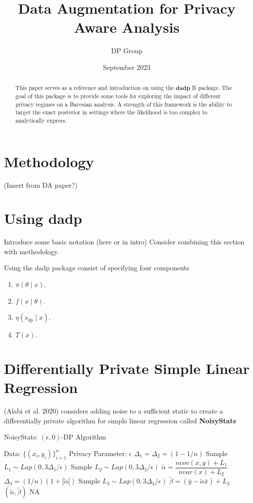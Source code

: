 \documentclass{article}\usepackage[]{graphicx}\usepackage[]{xcolor}
\title{Data Augmentation for Privacy Aware Analysis}
\author{DP Group}
\date{September 2023}
\theoremstyle{definition}
\newcommand{\dpn}{\textbf{dadp}}
\begin{document}
\maketitle

\begin{abstract}
    This paper serves as a reference and introduction on using the $\dpn$ R
    package. The goal of this package is to provide some tools for exploring the
    impact of different privacy regimes on a Bayesian analysis. A strength of
    this framework is the ability to target the exact posterior in settings
    where the likelihood is too complex to analytically express.
\end{abstract}

\section*{Methodology}
(Insert from DA paper?)



\section*{Using dadp}
Introduce some basic notation (here or in intro)
Consider combining this section with methodology.



Using the dadp package consist of specifying four components
\begin{enumerate}
  \item $\pi(\theta \mid x)$.
  \item $f(x \mid \theta)$.
  \item $\eta(s_{dp} \mid x)$.
  \item $T(x)$.
\end{enumerate}



\section*{Differentially Private Simple Linear Regression}

(Alabi et al. 2020)\cite{alabi2020} considers adding noise to a sufficient static
to create a differentially private algorithm for simple linear regression
called \textbf{NoisyStats}


\begin{algorithm}
\begin{algorithmic}[1]
\caption{NoisyStats: $(\epsilon, 0)$-DP Algorithm}
\State Data: $\{(x_i,y_i)\}_{i=1}^{n}$
\State Privacy Parameter: $\epsilon$
\State $\Delta_1 = \Delta_2 = (1 - 1/n)$ 
\State Sample $L_1 \sim Lap(0, 3\Delta_1/\epsilon)$
\State Sample $L_2 \sim Lap(0, 3\Delta_2/\epsilon)$
\State $\tilde{\alpha} = \dfrac{ncov(x,y) + L_1}{nvar(x) + L_2}$\\
\State $\Delta_3 = (1/n)(1 + |\tilde{\alpha}|)$
\State Sample $L_3 \sim Lap(0, 3\Delta_3/\epsilon)$
\State $\tilde{\beta} = (\bar{y} - \tilde{\alpha}\bar{x}) + L_3$
\State \Return $(\tilde{\alpha}, \tilde{\beta})$
\EndIf
\State \Return NA
\end{algorithmic}
\end{algorithm}
\end{document}

